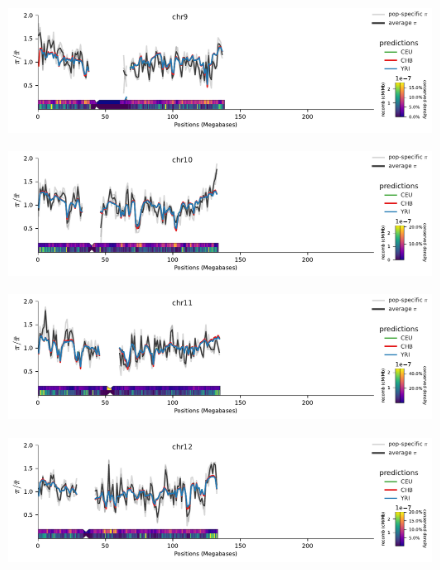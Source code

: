 \documentclass[11pt]{article}
\begin{document}
\begin{figure}[!htb]
  \centering
  \includegraphics[width=\textwidth]{figures/supplementary/pred_plot_chr9.pdf}
  \label{suppfig:fit-chr9}
\end{figure}


\begin{figure}[!htb]
  \centering
  \includegraphics[width=\textwidth]{figures/supplementary/pred_plot_chr10.pdf}
  \label{suppfig:fit-chr10}
\end{figure}


\begin{figure}[!htb]
  \centering
  \includegraphics[width=\textwidth]{figures/supplementary/pred_plot_chr11.pdf}
  \label{suppfig:fit-chr11}
\end{figure}


\begin{figure}[!htb]
  \centering
  \includegraphics[width=\textwidth]{figures/supplementary/pred_plot_chr12.pdf}
  \label{suppfig:fit-chr12}
\end{figure}
\end{document}
